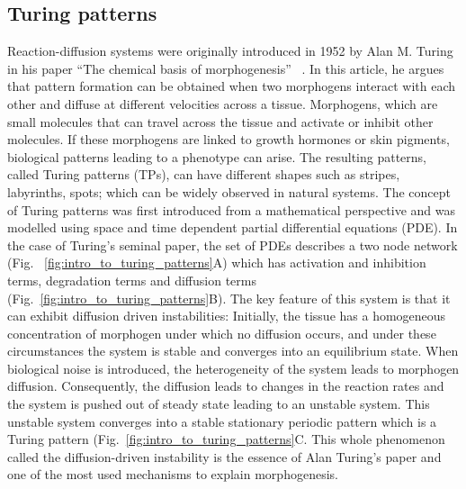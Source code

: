 \subsection{Turing patterns}
Reaction-diffusion systems were originally introduced in 1952 by Alan M. Turing in his paper “The chemical basis of morphogenesis” ~\parencite{Turing1952}.
In this article, he argues that pattern formation can be obtained when two morphogens interact with each other and diffuse at different
velocities across a tissue.
Morphogens, which are small molecules that can travel across the tissue and activate or inhibit other molecules.
If these morphogens are linked to growth hormones or skin pigments, biological patterns leading to a phenotype can arise.
The resulting patterns, called Turing patterns (TPs), can have different shapes such as stripes, labyrinths, spots; which can be widely observed in natural systems.
The concept of Turing patterns was first introduced from a mathematical perspective and was modelled using space and time dependent partial differential equations (PDE). In the case of Turing’s seminal paper, the set of PDEs describes a two node network (Fig. ~\ref{fig:intro_to_turing_patterns}A) which has activation and inhibition terms, degradation terms and diffusion terms (Fig.~\ref{fig:intro_to_turing_patterns}B).
The key feature of this system is that it can exhibit diffusion driven instabilities: Initially, the tissue has a homogeneous concentration of morphogen under which no diffusion occurs, and under these circumstances the system is stable and converges into an equilibrium state.
When biological noise is introduced, the heterogeneity of the system leads to morphogen diffusion.
Consequently, the diffusion leads to changes in the reaction rates and the system is pushed out of steady state leading to an unstable system.
This unstable system converges into a stable stationary periodic pattern which is a Turing pattern (Fig.~\ref{fig:intro_to_turing_patterns}C.
This whole phenomenon called the diffusion-driven instability is the essence of Alan Turing’s paper and one of the most used mechanisms to explain morphogenesis.

